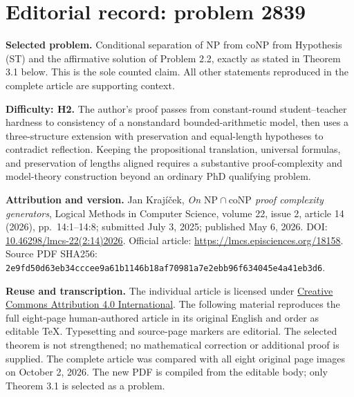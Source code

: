 \documentclass[11pt]{article}
\newcommand{\NP}{\mathrm{NP}}
\newcommand{\coNP}{\mathrm{coNP}}
\begin{document}
\section*{Editorial record: problem 2839}
\noindent\textbf{Selected problem.} Conditional separation of $\NP$ from $\coNP$ from Hypothesis (ST) and the affirmative solution of Problem 2.2, exactly as stated in Theorem 3.1 below. This is the sole counted claim. All other statements reproduced in the complete article are supporting context.

\noindent\textbf{Difficulty: H2.} The author's proof passes from constant-round student--teacher hardness to consistency of a nonstandard bounded-arithmetic model, then uses a three-structure extension with preservation and equal-length hypotheses to contradict reflection. Keeping the propositional translation, universal formulas, and preservation of lengths aligned requires a substantive proof-complexity and model-theory construction beyond an ordinary PhD qualifying problem.

\noindent\textbf{Attribution and version.} Jan Krajíček, \emph{On $\NP\cap\coNP$ proof complexity generators}, Logical Methods in Computer Science, volume 22, issue 2, article 14 (2026), pp.\ 14:1--14:8; submitted July 3, 2025; published May 6, 2026. DOI: \href{https://doi.org/10.46298/lmcs-22(2:14)2026}{10.46298/lmcs-22(2:14)2026}. Official article: \url{https://lmcs.episciences.org/18158}. Source PDF SHA256: \texttt{2e9fd\allowbreak 50d63\allowbreak eb34c\allowbreak ccee9\allowbreak a61b1\allowbreak 146b1\allowbreak 8af70\allowbreak 981a7\allowbreak e2ebb\allowbreak 96f63\allowbreak 4045e\allowbreak 4a41e\allowbreak b3d6}.

\noindent\textbf{Reuse and transcription.} The individual article is licensed under \href{https://creativecommons.org/licenses/by/4.0/}{Creative Commons Attribution 4.0 International}. The following material reproduces the full eight-page human-authored article in its original English and order as editable TeX. Typesetting and source-page markers are editorial. The selected theorem is not strengthened; no mathematical correction or additional proof is supplied. The complete article was compared with all eight original page images on October 2, 2026. The new PDF is compiled from the editable body; only Theorem 3.1 is selected as a problem.

\clearpage
\end{document}
